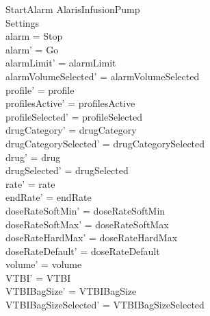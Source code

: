 \begin{schema}{StartAlarm}
	\Delta AlarisInfusionPump\\
	
	Settings\\
	\where
	alarm = Stop\\
	alarm' = Go\\
	alarmLimit' = alarmLimit\\
	alarmVolumeSelected' = alarmVolumeSelected\\
	profile' = profile\\
	profilesActive' = profilesActive\\  
	  profileSelected' = profileSelected\\
	  \pagebreak
	drugCategory' = drugCategory\\ drugCategorySelected' = drugCategorySelected\\
	drug' = drug\\ drugSelected' = drugSelected\\
	rate' = rate\\
	endRate' = endRate\\
	doseRateSoftMin' = doseRateSoftMin\\
	doseRateSoftMax' = doseRateSoftMax\\
	doseRateHardMax' = doseRateHardMax\\
	doseRateDefault' = doseRateDefault\\
	volume' = volume\\
	VTBI' = VTBI\\
	VTBIBagSize' = VTBIBagSize\\ VTBIBagSizeSelected' = VTBIBagSizeSelected\\

\end{schema}
